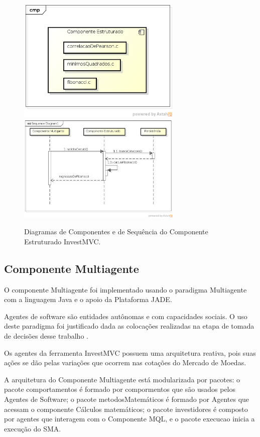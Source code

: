 \begin{figure}[H]
\centering
\includegraphics[width=0.7\textwidth]{figuras/componenteEstruturado}
\includegraphics[width=0.7\textwidth]{figuras/sequenciaEstruturado}
\caption{Diagramas de Componentes e de Sequência do Componente Estruturado InvestMVC.}
\label{sequenciaEstruturado}
\end{figure}

\subsection{Componente Multiagente}

O componente Multiagente foi implementado usando o paradigma Multiagente com a linguagem Java e o apoio da Plataforma JADE. 

Agentes de software são entidades autônomas e com capacidades sociais. O uso deste paradigma foi justificado dada as colocações realizadas na etapa de tomada de decisões desse trabalho \cite{agentBuilderWhy}. 

Os agentes da ferramenta  InvestMVC possuem uma arquitetura reativa, pois suas ações se dão pelas variações que ocorrem nas cotações do Mercado de Moedas.

A arquitetura do Componente Multiagente está modularizada por pacotes: o pacote comportamentos é formado por compormentos que são usados pelos Agentes de Software; o pacote metodosMatemáticos é formado por Agentes que acessam o componente Cálculos matemáticos; o pacote investidores é composto por agentes que interagem com o Componente MQL, e o pacote execucao inicia a execução do SMA.

